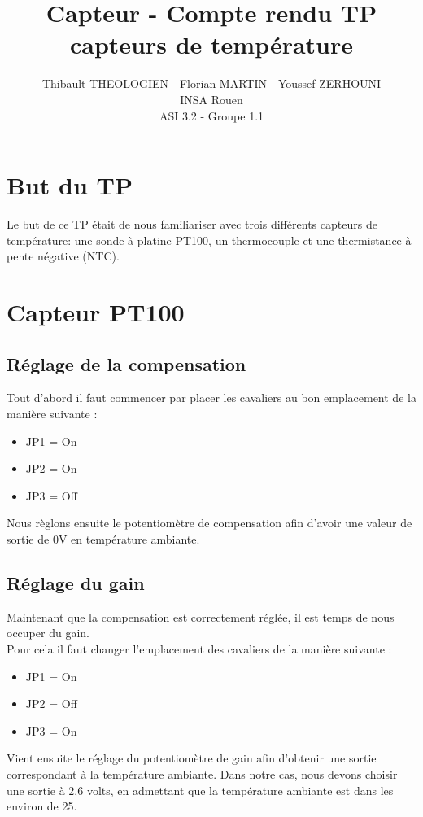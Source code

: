 \documentclass[a4paper,12pt]{article}
\title{Capteur - Compte rendu TP capteurs de température}
\author{
	Thibault THEOLOGIEN - Florian MARTIN - Youssef ZERHOUNI\\
	INSA Rouen\\
	ASI 3.2 - Groupe 1.1
}
\begin{document}
	\maketitle
	\tableofcontents
	\newpage

	\section{But du TP}
	\label{sec:But du TP}
		\par Le but de ce TP était de nous familiariser avec trois différents capteurs de température: une sonde à platine PT100, un thermocouple et une thermistance à pente négative (NTC).

  \section{Capteur PT100}

    \subsection{Réglage de la compensation}
      \par Tout d'abord il faut commencer par placer les cavaliers au bon emplacement de la manière suivante :
      \begin{itemize}
        \item JP1 = On
        \item JP2 = On
        \item JP3 = Off
      \end{itemize}
      \par Nous règlons ensuite le potentiomètre de compensation afin d'avoir une valeur de sortie de 0V en température ambiante.

    \subsection{Réglage du gain}
      \par Maintenant que la compensation est correctement réglée, il est temps de nous occuper du gain.\\
      Pour cela il faut changer l'emplacement des cavaliers de la manière suivante :
      \begin{itemize}
        \item JP1 = On
        \item JP2 = Off
        \item JP3 = On
      \end{itemize}
      \par Vient ensuite le réglage du potentiomètre de gain afin d'obtenir une sortie correspondant à la température ambiante.
      Dans notre cas, nous devons choisir une sortie à 2,6 volts, en admettant que la température ambiante est dans les environ de 25\degre.
\end{document}
